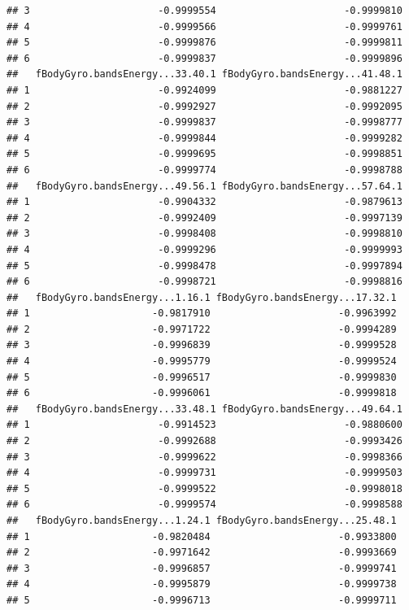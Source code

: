 \documentclass[
]{article}
\begin{document}
\begin{verbatim}
## 3                      -0.9999554                      -0.9999810
## 4                      -0.9999566                      -0.9999761
## 5                      -0.9999876                      -0.9999811
## 6                      -0.9999837                      -0.9999896
##   fBodyGyro.bandsEnergy...33.40.1 fBodyGyro.bandsEnergy...41.48.1
## 1                      -0.9924099                      -0.9881227
## 2                      -0.9992927                      -0.9992095
## 3                      -0.9999837                      -0.9998777
## 4                      -0.9999844                      -0.9999282
## 5                      -0.9999695                      -0.9998851
## 6                      -0.9999774                      -0.9998788
##   fBodyGyro.bandsEnergy...49.56.1 fBodyGyro.bandsEnergy...57.64.1
## 1                      -0.9904332                      -0.9879613
## 2                      -0.9992409                      -0.9997139
## 3                      -0.9998408                      -0.9998810
## 4                      -0.9999296                      -0.9999993
## 5                      -0.9998478                      -0.9997894
## 6                      -0.9998721                      -0.9998816
##   fBodyGyro.bandsEnergy...1.16.1 fBodyGyro.bandsEnergy...17.32.1
## 1                     -0.9817910                      -0.9963992
## 2                     -0.9971722                      -0.9994289
## 3                     -0.9996839                      -0.9999528
## 4                     -0.9995779                      -0.9999524
## 5                     -0.9996517                      -0.9999830
## 6                     -0.9996061                      -0.9999818
##   fBodyGyro.bandsEnergy...33.48.1 fBodyGyro.bandsEnergy...49.64.1
## 1                      -0.9914523                      -0.9880600
## 2                      -0.9992688                      -0.9993426
## 3                      -0.9999622                      -0.9998366
## 4                      -0.9999731                      -0.9999503
## 5                      -0.9999522                      -0.9998018
## 6                      -0.9999574                      -0.9998588
##   fBodyGyro.bandsEnergy...1.24.1 fBodyGyro.bandsEnergy...25.48.1
## 1                     -0.9820484                      -0.9933800
## 2                     -0.9971642                      -0.9993669
## 3                     -0.9996857                      -0.9999741
## 4                     -0.9995879                      -0.9999738
## 5                     -0.9996713                      -0.9999711

\end{verbatim}
\end{document}
